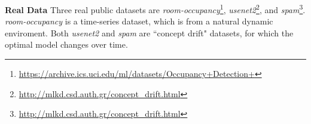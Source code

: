 \documentclass{article}
\begin{document}
\textbf{Real Data}
Three real public datasets are \textit{room-occupancy}\footnote{\url{https://archive.ics.uci.edu/ml/datasets/Occupancy+Detection+}},  \textit{usenet2}\footnote{\url{http://mlkd.csd.auth.gr/concept_drift.html}}, and \textit{spam}\footnote{\url{http://mlkd.csd.auth.gr/concept_drift.html}}. \textit{room-occupancy} is a time-series dataset, which is from a natural dynamic enviroment. Both \textit{usenet2} and \textit{spam} are  ``concept drift" \citep{Katakis:2010:TR} datasets, for which the optimal model changes over time.   

\end{document}
